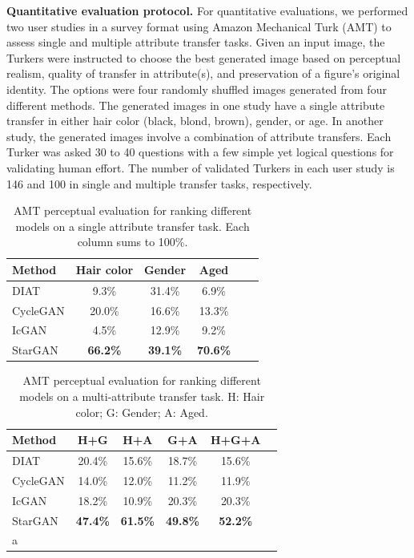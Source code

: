 \documentclass[10pt,twocolumn,letterpaper]{article}
\begin{document}
\medskip

\noindent\textbf{Quantitative evaluation protocol.} For quantitative evaluations, we performed two user studies in a survey format using Amazon Mechanical Turk (AMT) to assess single and multiple attribute transfer tasks. Given an input image, the Turkers were instructed to choose the best generated image based on perceptual realism, quality of transfer in attribute(s), and preservation of a figure's original identity. The options were four randomly shuffled images generated from four different methods. The generated images in one study have a single attribute transfer in either hair color (black, blond, brown), gender, or age. In another study, the generated images involve a combination of attribute transfers. Each Turker was asked 30 to 40 questions with a few simple yet logical questions for validating human effort. The number of validated Turkers in each user study is 146 and 100 in single and multiple transfer tasks, respectively.
\medskip



\begin{table}[ht]
\setlength{\tabcolsep}{10pt}
\begin{center}
\begin{tabular}{l c c c c c}
Method & Hair color & Gender & Aged \\
\hline
DIAT & 9.3\% & 31.4\% & 6.9\% \\
CycleGAN & 20.0\% & 16.6\% & 13.3\% \\
IcGAN & 4.5\% & 12.9\% & 9.2\% \\
StarGAN & \textbf{66.2\%} & \textbf{39.1\%} & \textbf{70.6\%} \\
\hline
\end{tabular}
\end{center}
\caption{AMT perceptual evaluation for ranking different models on a single attribute transfer task. Each column sums to 100\%.}
\label{table1}
\vspace{-0.1in}
\end{table}

\begin{table}[ht]
\begin{center}
\begin{tabular}{l c c c c c}
Method & H+G & H+A & G+A & H+G+A \\
\hline
DIAT & 20.4\% &15.6\% & 18.7\% & 15.6\% \\
CycleGAN & 14.0\% & 12.0\% & 11.2\% & 11.9\% \\
IcGAN & 18.2\% & 10.9\% & 20.3\% & 20.3\% \\
StarGAN & \textbf{47.4\%} & \textbf{61.5\%} & \textbf{49.8\%} & \textbf{52.2\%} \\
\hline
a\end{tabular}
\end{center}
\caption{AMT perceptual evaluation for ranking different models on a multi-attribute transfer task. H: Hair color; G: Gender; A: Aged.}
\label{table2}
\vspace{-0.1in}
\end{table}
\end{document}
